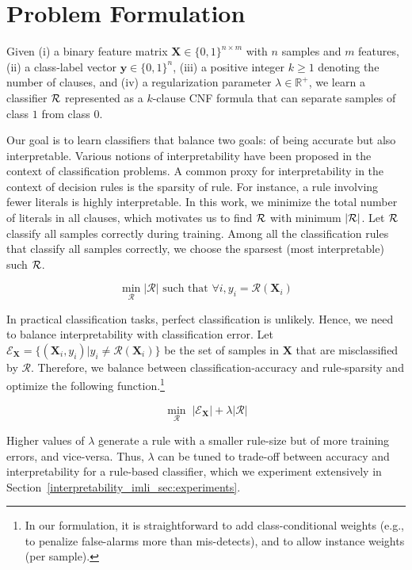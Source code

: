 

 \section{Problem Formulation}
 \label{interpretability_imli_sec:problem}
Given (i) a binary feature matrix $ \mathbf{X} \in \{0,1\}^{n \times m} $ with $ n $ samples and $ m $ features, (ii) a class-label vector $ \mathbf{y} \in \{0,1\}^n $, (iii) a positive integer $ k \ge 1 $ denoting the number of clauses, and (iv) a regularization parameter $ \lambda \in \mathbb{R}^+ $, we learn a classifier $ {\mathcal{R}} $ represented as a $ k $-clause CNF formula that can separate samples of class $ 1 $ from class $ 0 $. 
 
 

 Our goal is to learn classifiers that balance two 
 goals: of  being accurate but also interpretable.  
 Various notions of interpretability have been proposed in the context of   classification problems. A common proxy for interpretability in the context of decision rules 
 is the sparsity of rule. For instance, a rule involving fewer literals is highly interpretable.  In this work, we minimize the total number of literals in all clauses, which motivates us to  find $ {\mathcal{R}}  $ with minimum  $ |{\mathcal{R}}| $. Let $ {\mathcal{R}} $ classify all samples correctly during training. Among all the classification rules that classify all samples correctly,  we choose the sparsest (most interpretable) such $ {\mathcal{R}} $. 
 
 

 \[
 \min\limits_{\mathcal{R}} |\mathcal{R}|\text{ such that }\forall i, y_i=\mathcal{R}(\mathbf{X}_i)
 \]

 

 In practical classification tasks, perfect classification is unlikely. Hence, we need to balance interpretability with classification error.  Let $ \mathcal{E}_\mathbf{X} = \{(\mathbf{X}_i,y_i) | y_i \ne \mathcal{R}(\mathbf{X}_i) \} $   be  the set of samples in $ \mathbf{X} $ that are misclassified  by $ \mathcal{R} $. Therefore, we balance between classification-accuracy and rule-sparsity and optimize the following function.\footnote{In our formulation, it is  straightforward to add class-conditional weights  (e.g., to penalize  false-alarms more than mis-detects), and to allow instance weights (per sample).}

 \begin{equation}
  \label{interpretability_imli_eq:obj}
 \min\limits_{\mathcal{R}} \;  |\mathcal{E}_\mathbf{X}| +\lambda |\mathcal{R}|
 \end{equation}
 
Higher  values of $ \lambda $ generate a rule with a smaller rule-size but of more training errors, and vice-versa. Thus, $ \lambda $ can be tuned to trade-off between accuracy and interpretability for a rule-based classifier, which we experiment extensively in Section~\ref{interpretability_imli_sec:experiments}.

